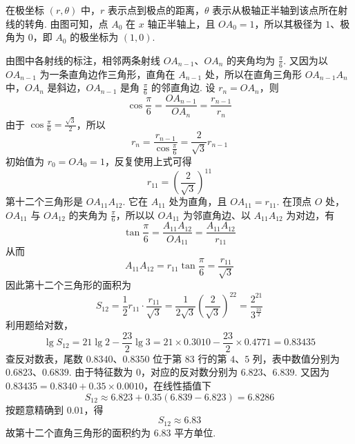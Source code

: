 \begin{solution}
在极坐标 \((r,\theta)\) 中，\(r\) 表示点到极点的距离，\(\theta\) 表示从极轴正半轴到该点所在射线的转角. 由图可知，点 \(A_0\) 在 \(x\) 轴正半轴上，且 \(OA_0=1\)，所以其极径为 \(1\)、极角为 \(0\)，即 \(A_0\) 的极坐标为 \(\left(1,0\right)\).

由图中各射线的标注，相邻两条射线 \(OA_{n-1}\)、\(OA_n\) 的夹角均为 \(\frac{\pi}{6}\). 又因为以 \(OA_{n-1}\) 为一条直角边作三角形，直角在 \(A_{n-1}\) 处，所以在直角三角形 \(OA_{n-1}A_n\) 中，\(OA_n\) 是斜边，\(OA_{n-1}\) 是角 \(\frac{\pi}{6}\) 的邻直角边. 设 \(r_n=OA_n\)，则
\[
\cos\frac{\pi}{6}=\frac{OA_{n-1}}{OA_n}=\frac{r_{n-1}}{r_n}
\]
由于 \(\cos\frac{\pi}{6}=\frac{\sqrt{3}}{2}\)，所以
\[
r_n=\frac{r_{n-1}}{\cos\frac{\pi}{6}}=\frac{2}{\sqrt{3}}r_{n-1}
\]
初始值为 \(r_0=OA_0=1\)，反复使用上式可得
\[
r_{11}=\left(\frac{2}{\sqrt{3}}\right)^{11}
\]
第十二个三角形是 \(OA_{11}A_{12}\). 它在 \(A_{11}\) 处为直角，且 \(OA_{11}=r_{11}\). 在顶点 \(O\) 处，\(OA_{11}\) 与 \(OA_{12}\) 的夹角为 \(\frac{\pi}{6}\)，所以以 \(OA_{11}\) 为邻直角边、以 \(A_{11}A_{12}\) 为对边，有
\[
\tan\frac{\pi}{6}=\frac{A_{11}A_{12}}{OA_{11}}=\frac{A_{11}A_{12}}{r_{11}}
\]
从而
\[
A_{11}A_{12}=r_{11}\tan\frac{\pi}{6}=\frac{r_{11}}{\sqrt{3}}
\]
因此第十二个三角形的面积为
\[
S_{12}=\frac{1}{2}r_{11}\cdot\frac{r_{11}}{\sqrt{3}}
=\frac{1}{2\sqrt{3}}\left(\frac{2}{\sqrt{3}}\right)^{22}
=\frac{2^{21}}{3^{\frac{23}{2}}}
\]
利用题给对数，
\[
\lg S_{12}=21\lg 2-\frac{23}{2}\lg 3
=21\times0.3010-\frac{23}{2}\times0.4771=0.83435
\]
查反对数表，尾数 \(0.8340\)、\(0.8350\) 位于第 \(83\) 行的第 \(4\)、\(5\) 列，表中数值分别为 \(0.6823\)、\(0.6839\). 由于特征数为 \(0\)，对应的反对数分别为 \(6.823\)、\(6.839\). 又因为 \(0.83435=0.8340+0.35\times0.0010\)，在线性插值下
\[
S_{12}\approx 6.823+0.35\left(6.839-6.823\right)=6.8286
\]
按题意精确到 \(0.01\)，得
\[
S_{12}\approx 6.83
\]
故第十二个直角三角形的面积约为 \(6.83\text{ 平方单位}\).
\end{solution}
